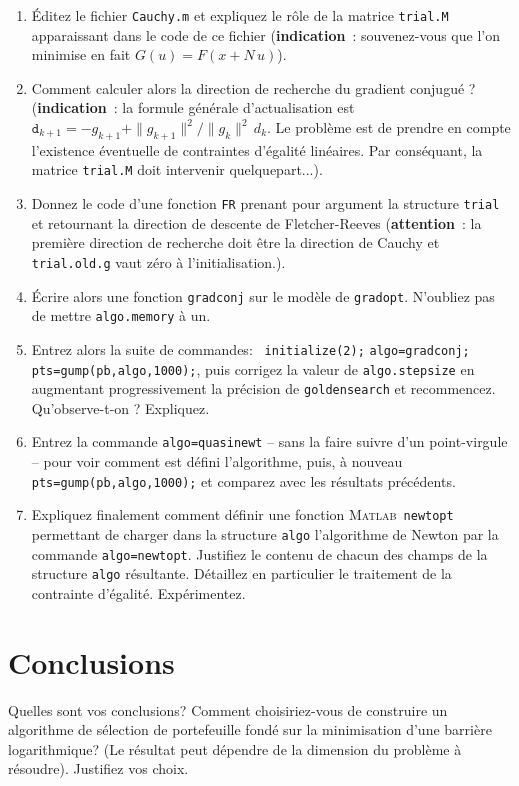 \documentclass[10pt,a4paper,fleqn]{report}
\newcommand{\matlab}{\textsc{Matlab}}
\newcommand{\onit}{\begin{enumerate}}
\newcommand{\offit}{\end{enumerate}}
\renewcommand{\tt}{\texttt}
\begin{document}
\onit
\item \'Editez le fichier \tt{Cauchy.m} et expliquez le r\^ole de la matrice \texttt{trial.M} apparaissant dans le code de ce fichier (\textbf{indication}~: souvenez-vous que l'on minimise en fait $G(u)=F(x+N\,u)$).
\item Comment calculer alors la direction de recherche du gradient conjugu\'e ? (\textbf{indication}~: la formule g\'en\'erale d'actualisation est $\mathtt d_{k+1}=-g_{k+1}+\|g_{k+1}\|^2/\|g_k\|^2\,d_k$. Le probl\`eme est de prendre en compte l'existence \'eventuelle de contraintes d'\'egalit\'e lin\'eaires. Par cons\'equant, la matrice \tt{trial.M} doit intervenir quelquepart...). 
 \item Donnez le code d'une fonction \texttt{FR} prenant pour argument la structure \texttt{trial} et retournant la direction de  descente de Fletcher-Reeves (\textbf{attention}~: la premi\`ere direction de recherche doit \^etre la direction de Cauchy et \tt{trial.old.g}  vaut z\'ero \`a  l'initialisation.).
\item \'Ecrire alors une fonction \tt{gradconj} sur le mod\`ele de \tt{gradopt}. N'oubliez pas de mettre \tt{algo.memory} \`a  un. 
\item Entrez alors la suite de commandes:
\tt{ initialize(2);} \tt{algo=gradconj;} \tt{pts=gump(pb,algo,1000);},
puis corrigez la valeur de \texttt{algo.stepsize} en augmentant progressivement la pr\'ecision de \texttt{goldensearch} et recommencez. Qu'observe-t-on ? Expliquez.
\item Entrez la commande \tt{algo=quasinewt} -- sans la faire suivre d'un point-virgule -- pour voir comment est d\'efini l'algorithme, puis, à nouveau \tt{pts=gump(pb,algo,1000);} et comparez avec les résultats précédents.
\item Expliquez finalement comment définir une fonction \matlab\ \tt{newtopt} permettant de charger dans la structure \tt{algo} l'algorithme de Newton par la commande \tt{algo=newtopt}. Justifiez le contenu de chacun des champs de la structure \tt{algo} résultante. Détaillez en particulier le traitement de la contrainte d'égalité. Expérimentez.

\offit

\section{Conclusions}

\bigskip

Quelles sont vos conclusions? Comment choisiriez-vous de construire un algorithme  de sélection de portefeuille fondé sur la minimisation d'une barrière logarithmique? (Le résultat peut dépendre de la dimension du problème à résoudre). Justifiez vos choix.
\end{document}
